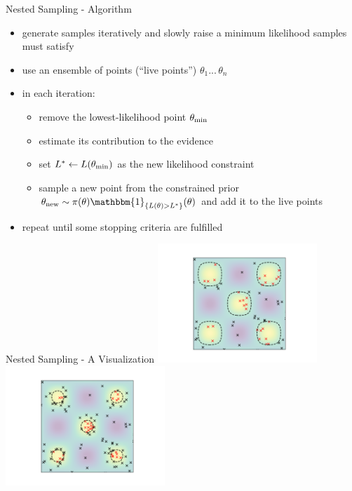 \documentclass[]{beamer}
\begin{document}
  \begin{frame}{Nested Sampling - Algorithm}
    \begin{itemize}
      \item generate samples iteratively and slowly raise a minimum likelihood samples must satisfy
      \item use an ensemble of points (``live points'') $\theta_1 ... \, \theta_n$
      \item in each iteration:
        \begin{itemize}
          \item remove the lowest-likelihood point $\theta_{\textnormal{min}}$
          \item estimate its contribution to the evidence
          \item set $L^* \leftarrow L(\theta_{\textnormal{min}})$ as the new likelihood constraint
          \item sample a new point from the constrained prior $\theta_{\textnormal{new}} \sim \pi(\theta) \mathbbm{1}_{\{L(\theta) > L^*\}}(\theta)$ and add it to the live points
        \end{itemize}
      \item repeat until some stopping criteria are fulfilled
    \end{itemize}
  \end{frame}
  \begin{frame}{Nested Sampling - A Visualization}
    \centering
    \includegraphics[trim={3.4cm 1.3cm 3.2cm 1.4cm}, clip, width=0.45\textwidth]{figs/ns_eggcrate_example_1.png}
    \includegraphics[trim={3.4cm 1.3cm 3.2cm 1.4cm}, clip, width=0.45\textwidth]{figs/ns_eggcrate_example_2.png}
  \end{frame}
\end{document}
